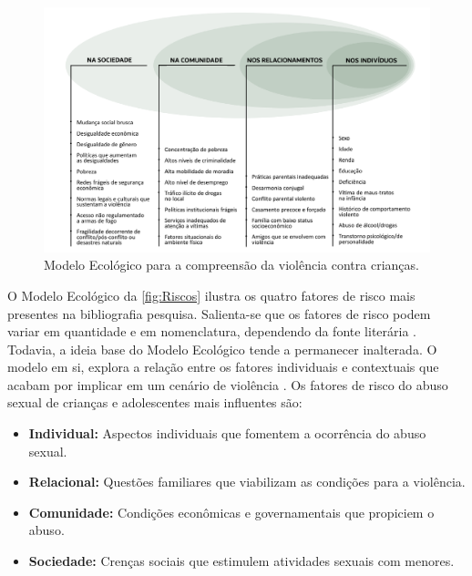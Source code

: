\begin{figure}[htb]

    \caption{\label{fig:Riscos}Modelo Ecológico para a compreensão da violência contra crianças.}
    \hspace{-2.8cm}
      \includegraphics[width=1.28\linewidth]{./Visuais/Ecologico.pdf}
  
  \end{figure}

O Modelo Ecológico da \autoref{fig:Riscos} ilustra os quatro fatores de risco mais presentes na bibliografia pesquisa. Salienta-se que os fatores de risco podem variar em quantidade e em nomenclatura, dependendo da fonte literária \cite{centers2004sexual, sexual2017department, blasco2018abuso, UNICEF2016promising}. Todavia, a ideia base do Modelo Ecológico tende a permanecer inalterada. O modelo em si, explora a relação entre os fatores individuais e contextuais que acabam por implicar em um cenário de violência \cite{dahlberg2006violencia}. Os fatores de risco do abuso sexual de crianças e adolescentes mais influentes são:

\begin{itemize}
    \item \textbf{Individual:} \hfill Aspectos individuais que fomentem a ocorrência do abuso sexual. %
    \item \textbf{Relacional:} \hfill Questões familiares que viabilizam as condições para a violência.  %
    \item \textbf{Comunidade:} \hfill Condições econômicas e governamentais que propiciem o abuso.
    \item \textbf{Sociedade:} \hfill Crenças sociais que estimulem atividades sexuais com menores. 
\end{itemize}

